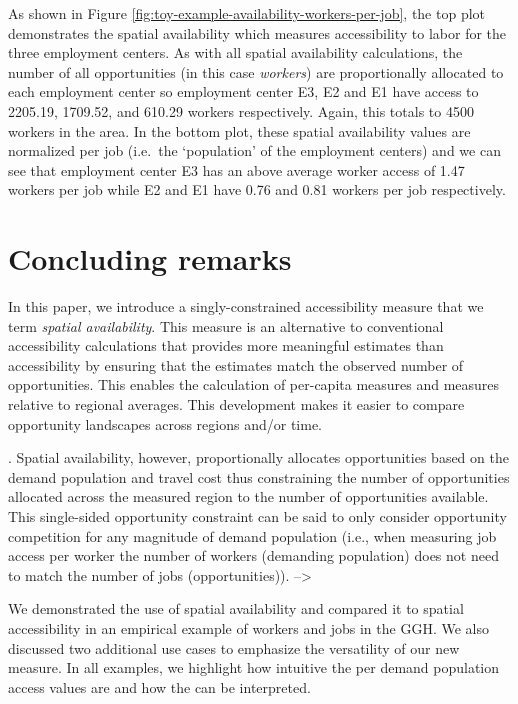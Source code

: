 \documentclass[]{elsarticle} %
\begin{document}
As shown in Figure \ref{fig:toy-example-availability-workers-per-job},
the top plot demonstrates the spatial availability which measures
accessibility to labor for the three employment centers. As with all
spatial availability calculations, the number of all opportunities (in
this case \emph{workers}) are proportionally allocated to each
employment center so employment center E3, E2 and E1 have access to
2205.19, 1709.52, and 610.29 workers respectively. Again, this totals to
4500 workers in the area. In the bottom plot, these spatial availability
values are normalized per job (i.e.~the `population' of the employment
centers) and we can see that employment center E3 has an above average
worker access of 1.47 workers per job while E2 and E1 have 0.76 and 0.81
workers per job respectively.

\hypertarget{concluding-remarks}{%
\section{Concluding remarks}\label{concluding-remarks}}

In this paper, we introduce a singly-constrained accessibility measure
that we term \emph{spatial availability}. This measure is an alternative
to conventional accessibility calculations that provides more meaningful
estimates than accessibility by ensuring that the estimates match the
observed number of opportunities. This enables the calculation of
per-capita measures and measures relative to regional averages. This
development makes it easier to compare opportunity landscapes across
regions and/or time.

. Spatial availability, however, proportionally allocates opportunities
based on the demand population and travel cost thus constraining the
number of opportunities allocated across the measured region to the
number of opportunities available. This single-sided opportunity
constraint can be said to only consider opportunity competition for any
magnitude of demand population (i.e., when measuring job access per
worker the number of workers (demanding population) does not need to
match the number of jobs (opportunities)). --\textgreater{}

We demonstrated the use of spatial availability and compared it to
spatial accessibility in an empirical example of workers and jobs in the
GGH. We also discussed two additional use cases to emphasize the
versatility of our new measure. In all examples, we highlight how
intuitive the per demand population access values are and how the can be
interpreted.
\end{document}
